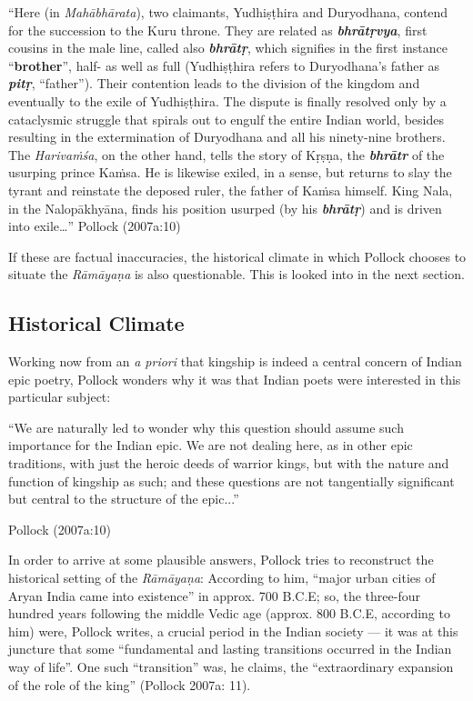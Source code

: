 \begin{myquote}
“Here (in {\sl Mahābhārata}), two claimants, Yudhiṣṭhira and Duryodhana, contend for the succession to the Kuru throne. They are related as {\sl\bfseries bhrātṛvya}, first cousins in the male line, called also {\sl\bfseries bhrātṛ}, which signifies in the first instance “{\bf brother}”, half- as well as full (Yudhiṣṭhira refers to Duryodhana’s father as {\sl\bfseries pitṛ}, “father”). Their contention leads to the division of the kingdom and eventually to the exile of Yudhiṣṭhira. The dispute is finally resolved only by a cataclysmic struggle that spirals out to engulf the entire Indian world, besides resulting in the extermination of Duryodhana and all his ninety-nine brothers. The {\sl Harivaṁśa}, on the other hand, tells the story of Kṛṣṇa, the {\sl\bfseries bhrātr} of the usurping prince Kaṁsa. He is likewise exiled, in a sense, but returns to slay the tyrant and reinstate the deposed ruler, the father of Kaṁsa himself. King Nala, in the Nalopākhyāna, finds his position usurped (by his {\sl\bfseries bhrātṛ}) and is driven into exile…”
\hfill Pollock (2007a:10)
\end{myquote}

If these are factual inaccuracies, the historical climate in which Pollock chooses to situate the {\sl Rāmāyaṇa} is also questionable. This is looked into in the next section.


\subsection{Historical Climate}\label{sec1.1.2}

Working now from an {\sl a priori} that kingship is indeed a central concern of Indian epic poetry, Pollock wonders why it was that Indian poets were interested in this particular subject:

\begin{myquote}
“We are naturally led to wonder why this question should assume such importance for the Indian epic. We are not dealing here, as in other epic traditions, with just the heroic deeds of warrior kings, but with the nature and function of kingship as such; and these questions are not tangentially significant but central to the structure of the epic...”

\hfill Pollock (2007a:10)
\end{myquote}

In order to arrive at some plausible answers, Pollock tries to reconstruct the historical setting of the {\sl Rāmāyaṇa}: According to him, “major urban cities of Aryan India came into existence” in approx. 700 B.C.E; so, the three-four hundred years following the middle Vedic age (approx. 800 B.C.E, according to him) were, Pollock writes, a crucial period in the Indian society --- it was at this juncture that some “fundamental and lasting transitions occurred in the Indian way of life”. One such “transition” was, he claims, the “extraordinary expansion of the role of the king” (Pollock 2007a: 11). 


